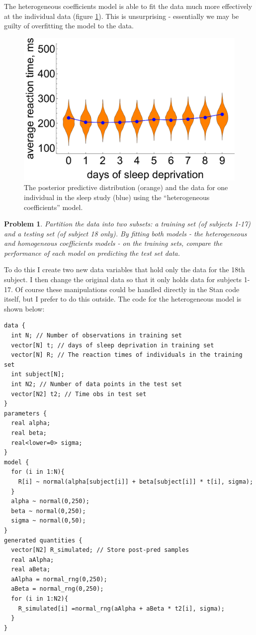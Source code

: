 \documentclass{article}
\newtheorem{problem}{Problem}[section]
\begin{document}
The heterogeneous coefficients model is able to fit the data much more effectively at the individual data (figure \ref{fig:lec6_sleepPPCHetero}). This is unsurprising - essentially we may be guilty of overfitting the model to the data.

\begin{figure}[ht]
	\centerline{\includegraphics[width=1.25\textwidth]{figures/lec6_sleepPPCHeterogeneous1.pdf}}
	\caption{The posterior predictive distribution (orange) and the data for one individual in the sleep study (blue) using the ``heterogeneous coefficients'' model.}\label{fig:lec6_sleepPPCHetero}
\end{figure}

\begin{problem}
	Partition the data into two subsets: a training set (of subjects 1-17) and a testing set (of subject 18 only). By fitting both models - the heterogeneous and homogeneous coefficients models - on the training sets, compare the performance of each model on predicting the test set data.
\end{problem}
To do this I create two new data variables that hold only the data for the 18th subject. I then change the original data so that it only holds data for subjects 1-17. Of course these manipulations could be handled directly in the Stan code itself, but I prefer to do this outside. The code for the heterogeneous model is shown below:

\begin{verbatim}
data {
  int N; // Number of observations in training set
  vector[N] t; // days of sleep deprivation in training set
  vector[N] R; // The reaction times of individuals in the training set
  int subject[N];
  int N2; // Number of data points in the test set
  vector[N2] t2; // Time obs in test set
}
parameters {
  real alpha;
  real beta;
  real<lower=0> sigma;
} 
model {
  for (i in 1:N){
    R[i] ~ normal(alpha[subject[i]] + beta[subject[i]] * t[i], sigma);
  }
  alpha ~ normal(0,250);
  beta ~ normal(0,250);
  sigma ~ normal(0,50);
}
generated quantities {
  vector[N2] R_simulated; // Store post-pred samples
  real aAlpha;
  real aBeta;
  aAlpha = normal_rng(0,250);
  aBeta = normal_rng(0,250);
  for (i in 1:N2){
    R_simulated[i] =normal_rng(aAlpha + aBeta * t2[i], sigma);
  }
}
\end{verbatim}
\end{document}

